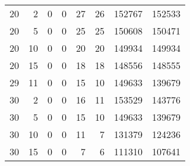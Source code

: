 \begin{tabular}{rrrrrrrr}
20 &  2 &               0 &          0 &          27 &         26 &       152767 &     152533 \\
20 &  5 &               0 &          0 &          25 &         25 &       150608 &     150471 \\
20 & 10 &               0 &          0 &          20 &         20 &       149934 &     149934 \\
20 & 15 &               0 &          0 &          18 &         18 &       148556 &     148555 \\
29 & 11 &               0 &          0 &          15 &         10 &       149633 &     139679 \\
30 &  2 &               0 &          0 &          16 &         11 &       153529 &     143776 \\
30 &  5 &               0 &          0 &          15 &         10 &       149633 &     139679 \\
30 & 10 &               0 &          0 &          11 &          7 &       131379 &     124236 \\
30 & 15 &               0 &          0 &           7 &          6 &       111310 &     107641 \\
\bottomrule
\end{tabular}
